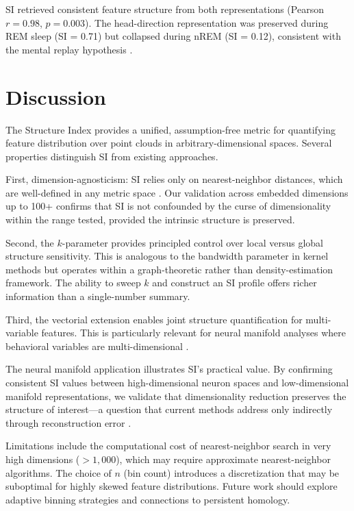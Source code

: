 \documentclass[11pt]{article}
\begin{document}
SI retrieved consistent feature structure from both representations (Pearson $r = 0.98$, $p = 0.003$). The head-direction representation was preserved during REM sleep (SI = 0.71) but collapsed during nREM (SI = 0.12), consistent with the mental replay hypothesis \citep{peyrache2015internally}.

\section{Discussion}

The Structure Index provides a unified, assumption-free metric for quantifying feature distribution over point clouds in arbitrary-dimensional spaces. Several properties distinguish SI from existing approaches.

First, dimension-agnosticism: SI relies only on nearest-neighbor distances, which are well-defined in any metric space \citep{cover1967nearest}. Our validation across embedded dimensions up to 100+ confirms that SI is not confounded by the curse of dimensionality within the range tested, provided the intrinsic structure is preserved.

Second, the $k$-parameter provides principled control over local versus global structure sensitivity. This is analogous to the bandwidth parameter in kernel methods \citep{ripley2009spatial} but operates within a graph-theoretic rather than density-estimation framework. The ability to sweep $k$ and construct an SI profile offers richer information than a single-number summary.

Third, the vectorial extension enables joint structure quantification for multi-variable features. This is particularly relevant for neural manifold analyses where behavioral variables are multi-dimensional \citep{gardner2022toroidal, low2018probing}.

The neural manifold application illustrates SI's practical value. By confirming consistent SI values between high-dimensional neuron spaces and low-dimensional manifold representations, we validate that dimensionality reduction preserves the structure of interest---a question that current methods address only indirectly through reconstruction error \citep{cunningham2014dimensionality, jazayeri2021interpreting}.

Limitations include the computational cost of nearest-neighbor search in very high dimensions ($>1{,}000$), which may require approximate nearest-neighbor algorithms. The choice of $n$ (bin count) introduces a discretization that may be suboptimal for highly skewed feature distributions. Future work should explore adaptive binning strategies and connections to persistent homology.
\end{document}
